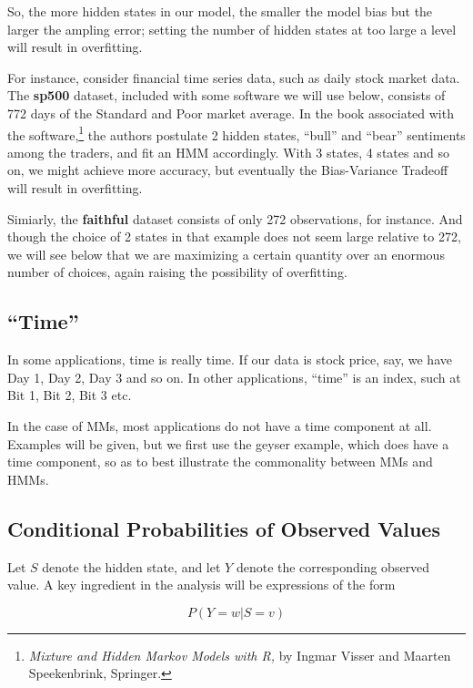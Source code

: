 \documentclass[11pt]{article}
\begin{document}
So, the more hidden states in our model, the smaller the model bias but
the larger the ampling error; setting the number of hidden states at too
large a level will result in overfitting.

For instance, consider financial time series data, such as daily stock
market data.  The \textbf{sp500} dataset, included with some software we
will use below, consists of 772 days of the Standard and Poor market
average.  In the book associated with the software,\footnote{\textit{Mixture and
Hidden Markov Models with R,} by Ingmar Visser and Maarten
Speekenbrink, Springer.} the authors postulate 2 hidden states, ``bull''
and ``bear'' sentiments among the traders, and fit an HMM accordingly.
With 3 states, 4 states and so on, we might achieve more accuracy, 
but eventually the Bias-Variance Tradeoff will result in overfitting.

Simiarly, the \textbf{faithful} dataset consists of only 272
observations, for instance.  And though the choice of 2 states in that
example does not seem large relative to 272, we will see below that we
are maximizing a certain quantity over an enormous number of choices,
again raising the possibility of overfitting.

\subsection{``Time''}

In some applications, time is really time.  If our data is stock price,
say, we have Day 1, Day 2, Day 3 and so on.  In other applications,
``time'' is an index, such at Bit 1, Bit 2, Bit 3 etc.

In the case of MMs, most applications do not have a time component at
all.  Examples will be given, but we first use the geyser example, which does
have a time component, so as to best illustrate the commonality between
MMs and HMMs.

\subsection{Conditional Probabilities of Observed Values}

Let $S$ denote the hidden state, and let $Y$ denote the corresponding
observed value.  A key ingredient in the analysis will be expressions of
the form

\begin{equation}
P(Y = w | S  = v)
\end{equation}
\end{document}

